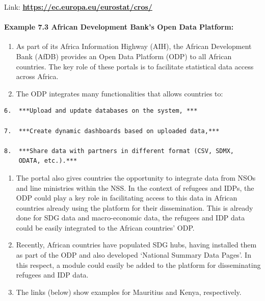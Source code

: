 \documentclass[
]{article}
\begin{document}
Link:
\href{https://ec.europa.eu/eurostat/cros/}{\textbf{https://ec.europa.eu/eurostat/cros/}}

\hypertarget{example-7.3-african-development-banks-open-data-platform}{%
\paragraph{Example 7.3 African Development Bank's Open Data Platform:}\label{example-7.3-african-development-banks-open-data-platform}}

\begin{enumerate}
\def\labelenumi{\arabic{enumi}.}
\setcounter{enumi}{499}
\item
  As part of its Africa Information Highway (AIH), the African
  Development Bank (AfDB) provides an Open Data Platform (ODP) to all
  African countries. The key role of these portals is to facilitate
  statistical data access across Africa.
\item
  The ODP integrates many functionalities that allows countries to:
\end{enumerate}

\begin{verbatim}
6.  ***Upload and update databases on the system, ***

7.  ***Create dynamic dashboards based on uploaded data,***

8.  ***Share data with partners in different format (CSV, SDMX,
    ODATA, etc.).***
\end{verbatim}

\begin{enumerate}
\def\labelenumi{\arabic{enumi}.}
\setcounter{enumi}{501}
\item
  The portal also gives countries the opportunity to integrate data
  from NSOs and line ministries within the NSS. In the context of
  refugees and IDPs, the ODP could play a key role in facilitating
  access to this data in African countries already using the platform
  for their dissemination. This is already done for SDG data and
  macro-economic data, the refugees and IDP data could be easily
  integrated to the African countries' ODP.
\item
  Recently, African countries have populated SDG hubs, having
  installed them as part of the ODP and also developed `National
  Summary Data Pages'. In this respect, a module could easily be added
  to the platform for disseminating refugees and IDP data.
\item
  The links (below) show examples for Mauritius and Kenya,
  respectively.
\end{enumerate}
\end{document}
